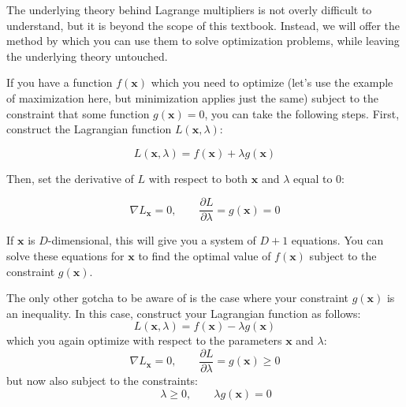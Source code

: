 The underlying theory behind Lagrange multipliers is not overly difficult to understand, but it is beyond the scope of this textbook. Instead, we will offer the method by which you can use them to solve optimization problems, while leaving the underlying theory untouched.

If you have a function $f(\textbf{x})$ which you need to optimize (let's use the example of maximization here, but minimization applies just the same) subject to the constraint that some function $g(\textbf{x}) = 0$, you can take the following steps. First, construct the Lagrangian function $L(\textbf{x}, \lambda)$:

\begin{equation*}
	L(\textbf{x}, \lambda) = f(\textbf{x}) + \lambda g(\textbf{x})
\end{equation*}

Then, set the derivative of $L$ with respect to both $\textbf{x}$ and $\lambda$ equal to 0:

\begin{equation*}
	\nabla L_{\textbf{x}} = 0, \qquad \frac{\partial L}{\partial \lambda} = g(\textbf{x}) = 0
\end{equation*}

If $\textbf{x}$ is $D$-dimensional, this will give you a system of $D+1$ equations. You can solve these equations for $\textbf{x}$ to find the optimal value of $f(\textbf{x})$ subject to the constraint $g(\textbf{x})$.

The only other gotcha to be aware of is the case where your constraint $g(\textbf{x})$ is an inequality. In this case, construct your Lagrangian function as follows:
\begin{equation*}
	L(\textbf{x}, \lambda) = f(\textbf{x}) - \lambda g(\textbf{x})
\end{equation*}
which you again optimize with respect to the parameters $\textbf{x}$ and $\lambda$:
\begin{equation*}
	\nabla L_{\textbf{x}} = 0, \qquad \frac{\partial L}{\partial \lambda} = g(\textbf{x}) \geq 0
\end{equation*}
but now also subject to the constraints:
\begin{equation*}
	\qquad \lambda \geq 0, \qquad \lambda g(\textbf{x}) = 0
\end{equation*}


